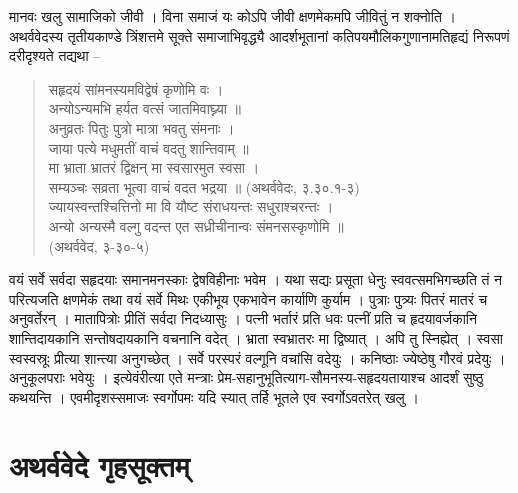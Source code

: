 मानवः खलु सामाजिको जीवी । विना समाजं यः कोऽपि जीवी क्षणमेकमपि जीवितुं न शक्नोति । अथर्ववेदस्य तृतीयकाण्डे त्रिंशत्तमे सूक्ते समाजाभिवृद्ध्यै आदर्शभूतानां कतिपयमौलिकगुणानामतिहृद्यं निरूपणं दरीदृश्यते तद्यथा –
\begin{verse}
सहृदयं सांमनस्यमविद्वेषं कृणोमि वः ।\\
अन्योऽन्यमभि हर्यत वत्सं जातमिवाघ्न्या ॥\\
अनुव्रतः पितुः पुत्रो मात्रा भवतु संमनाः ।\\
जाया पत्ये मधुमतीं वाचं वदतु शान्तिवाम् ॥\\
मा भ्राता भ्रातरं द्विक्षन् मा स्वसारमुत स्वसा ।\\
सम्यञ्चः सव्रता भूत्वा वाचं वदत भद्रया ॥ (अथर्ववेदः, ३.३०.१-३)\\
ज्यायस्वन्तश्चित्तिनो मा वि यौष्ट संराधयन्तः सधुराश्चरन्तः ।\\
अन्यो अन्यस्मै वल्गु वदन्त एत सध्रीचीनान्वः संमनसस्कृणोमि ॥\\
\hfill (अथर्ववेद, ३-३०-५)
\end{verse}
वयं सर्वे सर्वदा सहृदयाः समानमनस्काः द्वेषविहीनाः भवेम । यथा सद्यः प्रसूता धेनुः स्ववत्समभिगच्छति तं न परित्यजति क्षणमेकं तथा वयं सर्वे मिथः एकीभूय एकभावेन कार्याणि कुर्याम । पुत्राः पुत्र्यः पितरं मातरं च अनुवर्तेरन् । मातापित्रोः प्रीतिं सर्वदा निदध्यासुः । पत्नी भर्तारं प्रति धवः पत्नीं प्रति च हृदयावर्जकानि शान्तिदायकानि सन्तोषदायकानि वचनानि वदेत् । भ्राता स्वभ्रातरः मा द्विष्यात् । अपि तु स्निह्येत् । स्वसा स्वस्वस्रूः प्रीत्या शान्त्या अनुगच्छेत् । सर्वे परस्परं वल्गूनि वचांसि वदेयुः । कनिष्ठाः ज्येष्ठेषु गौरवं प्रदेयुः । अनुकूलपराः भवेयुः । इत्येवंरीत्या एते मन्त्राः प्रेम-सहानुभूतित्याग-सौमनस्य-सहृदयतायाश्च आदर्शं सुष्ठु कथयन्ति । एवमीदृशस्समाजः स्वर्गोपमः यदि स्यात् तर्हि भूतले एव स्वर्गोऽवतरेत् खलु ।

\section*{अथर्ववेदे गृहसूक्तम्}

